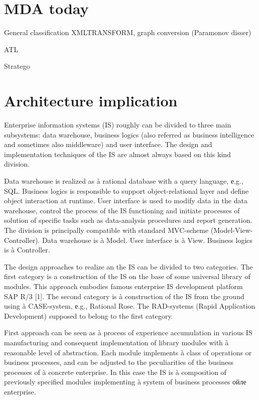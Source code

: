 \documentclass{intech}
\begin{document}
\section{MDA today}
\label{sec:mda-today}

General classification XMLTRANSFORM, graph conversion (Paramonov disser)

ATL

Stratego



\section{Architecture implication}
\label{sec:arch-imp}

Enterprise information systems (IS) roughly can be divided to three main subsystems: data warehouse, business logics (also referred as business intelligence and sometimes also middleware) and user interface. The design and implementation techniques of the IS are almost always based on this kind division.

Data warehouse is realized as à rational database with a query language, е.g., SQL. Business logics is responsible to support object-relational layer and define object interaction at runtime. User interface is used to modify data in the data warehouse, control the process of the IS functioning and initiate processes of solution of specific tasks such as data-analysis procedures and report generation. The division is principally compatible with standard MVC-scheme (Model-View-Controller). Data warehouse is à Model. User interface is à View. Business logics is à Controller.

The design approaches to realize an the IS can be divided to two categories. The first category is a construction of the IS on the base of some universal library of modules. This approach embodies famous enterprise IS development platform SAP R/3 [1]. The second category is à construction of the IS from the ground using à CASE-system, е.g., Rational Rose. The RAD-systems (Rapid Application Development) supposed to belong to the first category.

First approach can be seen as à process of experience accumulation in various IS manufacturing and consequent implementation of library modules with à reasonable level of abstraction. Each module implements à class of operations or business processes, and can be adjusted to the peculiarities of the business processes of à concrete enterprise. In this case the IS is à composition of previously specified modules implementing à system of business processes ойле enterprise.
\end{document}
